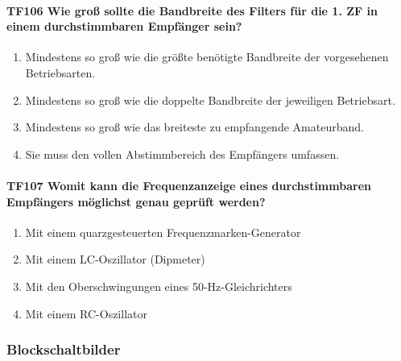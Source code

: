 \documentclass[8pt]{article}
\begin{document}
\begin{enumerate}
\paragraph*{TF106 Wie groß sollte die Bandbreite des Filters für die 1. ZF in einem durchstimmbaren Empfänger sein?}
\begin{enumerate}[nolistsep,label=\Alph*]
\item Mindestens so groß wie die größte benötigte Bandbreite der vorgesehenen Betriebsarten.
\item Mindestens so groß wie die doppelte Bandbreite der jeweiligen Betriebsart.
\item Mindestens so groß wie das breiteste zu empfangende Amateurband.
\item Sie muss den vollen Abstimmbereich des Empfängers umfassen.
\end{enumerate}

\paragraph*{TF107 Womit kann die Frequenzanzeige eines durchstimmbaren Empfängers möglichst genau geprüft werden?}
\begin{enumerate}[nolistsep,label=\Alph*]
\item Mit einem quarzgesteuerten Frequenzmarken-Generator
\item Mit einem LC-Oszillator (Dipmeter)
\item Mit den Oberschwingungen eines 50-Hz-Gleichrichters
\item Mit einem RC-Oszillator
\end{enumerate}

\pagebreak
\subsubsection{Blockschaltbilder}

\end{enumerate}
\end{document}
